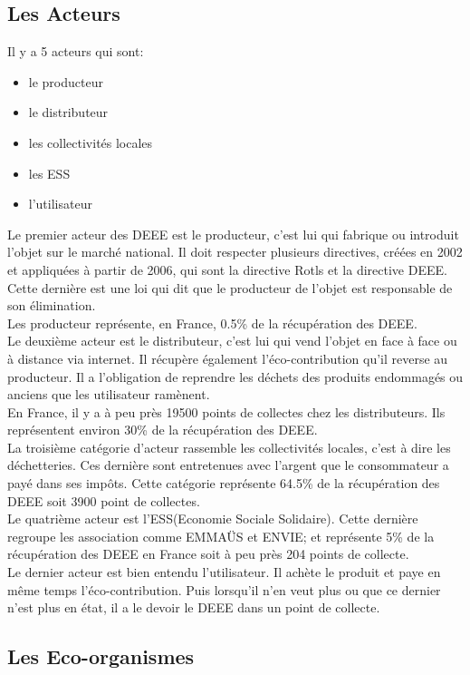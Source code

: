 \documentclass[a4paper,11pt]{report}
\begin{document}
\subsection*{Les Acteurs}
Il y a 5 acteurs qui sont: 
\begin{itemize}
\item le producteur
\item le distributeur
\item les collectivités locales
\item les ESS
\item l'utilisateur\\
\end{itemize}
\newpage
Le premier acteur des DEEE est le producteur, c'est lui qui fabrique ou introduit l'objet sur le marché national.
Il doit respecter plusieurs directives, créées en 2002 et appliquées à partir de 2006, qui sont la directive Rotls et la directive DEEE. Cette dernière est une loi qui dit que le producteur de l'objet est responsable de son élimination.\\
Les producteur représente, en France, 0.5\% de la récupération des DEEE.
\\

Le deuxième acteur est le distributeur, c'est lui qui vend l'objet en face à face ou à distance via internet. Il récupère également l'éco-contribution qu'il reverse au producteur. Il a l'obligation de reprendre les déchets des produits endommagés ou anciens que les utilisateur ramènent.\\
En France, il y a à peu près 19500 points de collectes chez les distributeurs. Ils représentent environ 30\% de la récupération des DEEE.
\\

La troisième catégorie d'acteur rassemble les collectivités locales, c'est à dire les déchetteries. Ces dernière sont entretenues avec l'argent que le consommateur a payé dans ses impôts.
Cette catégorie représente 64.5\% de la récupération des DEEE soit 3900 point de collectes.
\\

Le quatrième acteur est l'ESS(Economie Sociale Solidaire). Cette dernière regroupe les association comme EMMAÜS et ENVIE; et représente 5\% de la récupération des DEEE en France soit à peu près 204 points de collecte.
\\

Le dernier acteur est bien entendu l'utilisateur. Il achète le produit et paye en même temps l'éco-contribution. Puis lorsqu'il n'en veut plus ou que ce dernier n'est plus en état, il a le devoir  le DEEE dans un point de collecte. 


\subsection*{Les Eco-organismes}
\end{document}
